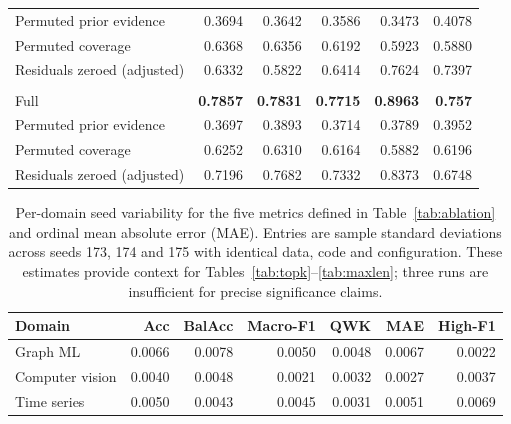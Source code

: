 \begin{table}[t]
\begin{tabular}{@{}l rrrrr@{}}
\quad Permuted prior evidence & 0.3694 & 0.3642 & 0.3586 & 0.3473 & 0.4078 \\
\quad Permuted coverage & 0.6368 & 0.6356 & 0.6192 & 0.5923 & 0.5880 \\
\quad Residuals zeroed (adjusted) & 0.6332 & 0.5822 & 0.6414 & 0.7624 & 0.7397 \\
\addlinespace
\multicolumn{6}{@{}l}{\emph{Time series}} \\
\quad Full & \textbf{0.7857} & \textbf{0.7831} & \textbf{0.7715} & \textbf{0.8963} & \textbf{0.757} \\
\quad Permuted prior evidence & 0.3697 & 0.3893 & 0.3714 & 0.3789 & 0.3952 \\
\quad Permuted coverage & 0.6252 & 0.6310 & 0.6164 & 0.5882 & 0.6196 \\
\quad Residuals zeroed (adjusted) & 0.7196 & 0.7682 & 0.7332 & 0.8373 & 0.6748 \\
\bottomrule
\end{tabular}
\end{table}

\begin{table}[t]
\centering
\footnotesize
\setlength{\tabcolsep}{6pt}
\renewcommand{\arraystretch}{1.05}
\caption{Per-domain seed variability for the five metrics defined in
Table~\ref{tab:ablation} and ordinal mean absolute error (MAE). Entries are sample standard deviations across seeds
173, 174 and 175 with identical data, code and configuration. These estimates
provide context for Tables~\ref{tab:topk}--\ref{tab:maxlen}; three runs
are insufficient for precise significance claims.}
\label{tab:seed-noise}
\begin{tabular}{@{}l rrrrrr@{}}
\toprule
Domain & Acc & BalAcc & Macro-F1 & QWK & MAE & High-F1 \\
\midrule
Graph ML & 0.0066 & 0.0078 & 0.0050 & 0.0048 & 0.0067 & 0.0022 \\
Computer vision & 0.0040 & 0.0048 & 0.0021 & 0.0032 & 0.0027 & 0.0037 \\
Time series & 0.0050 & 0.0043 & 0.0045 & 0.0031 & 0.0051 & 0.0069 \\
\bottomrule
\end{tabular}
\end{table}

